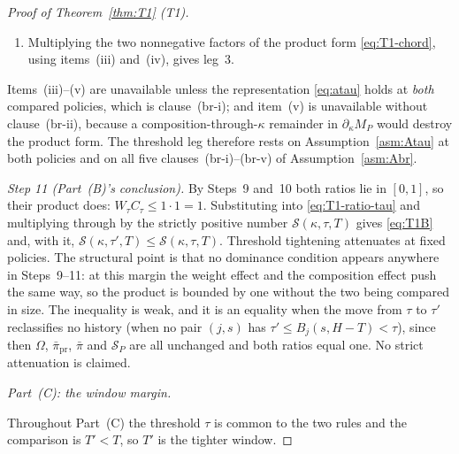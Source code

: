 \documentclass[11pt]{article}
\begin{document}
\begin{proof}[Proof of Theorem~\ref{thm:T1} (T1)]
\begin{enumerate}[label=(\roman*),leftmargin=2.4em,itemsep=3pt]
  Assumption~\ref{asm:Abr}.
\item Multiplying the two nonnegative factors of the product form \eqref{eq:T1-chord}, using
  items~(iii) and~(iv), gives leg~3.
\end{enumerate}
Items~(iii)--(v) are unavailable unless the representation \eqref{eq:atau} holds at \emph{both}
compared policies, which is clause~(br-i); and item~(v) is unavailable without clause~(br-ii),
because a composition-through-$\kappa$ remainder in $\partial_\kappa M_P$ would destroy the product
form. The threshold leg therefore rests on Assumption~\ref{asm:Atau} at both policies and on all
five clauses~(br-i)--(br-v) of Assumption~\ref{asm:Abr}.

\emph{Step 11 (Part~(B)'s conclusion).} By Steps~9 and~10 both ratios lie in $[0,1]$, so their
product does: $W_\tau C_\tau \le 1\cdot 1 = 1$. Substituting into \eqref{eq:T1-ratio-tau} and
multiplying through by the strictly positive number $\mathcal S(\kappa,\tau,T)$ gives
\eqref{eq:T1B} and, with it,
$\mathcal S(\kappa,\tau',T) \le \mathcal S(\kappa,\tau,T)$. Threshold tightening attenuates at
fixed policies. The structural point is that no dominance condition appears anywhere in Steps~9--11:
at this margin the weight effect and the composition effect push the same way, so the product is
bounded by one without the two being compared in size. The inequality is weak, and it is an
equality when the move from $\tau$ to $\tau'$ reclassifies no history (when no pair $(j,s)$ has
$\tau' \le B_j(s,H-T) < \tau$), since then $\Omega$, $\bar\pi_{\mathrm{pr}}$, $\bar\pi$ and
$\mathcal S_P$ are all unchanged and both ratios equal one. No strict attenuation is claimed.

\medskip
\noindent\emph{Part~(C): the window margin.}

Throughout Part~(C) the threshold $\tau$ is common to the two rules and the comparison is
$T' < T$, so $T'$ is the tighter window.


\end{proof}
\end{document}
